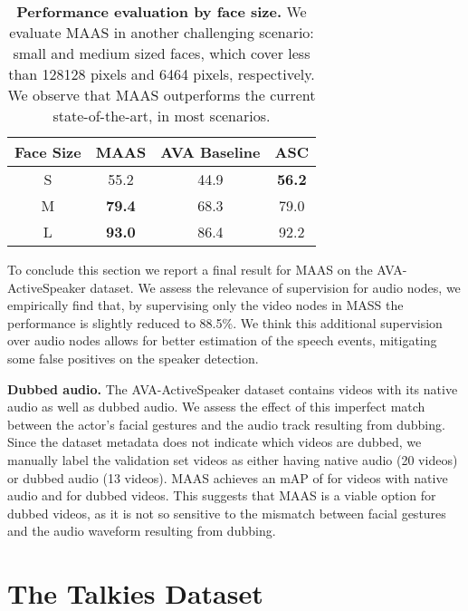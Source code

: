 \documentclass[10pt,twocolumn,letterpaper]{article}
\begin{document}
\begin{table}[h]
    \small
    \centering
    \begin{tabular}{c c c c }
        \hline
        \textbf{Face Size}  & \textbf{MAAS}  & \textbf{AVA Baseline} \cite{roth2019ava} & \textbf{ASC} \cite{alcazar2020active} \\
        \hline 
        S & 55.2 & 44.9 & \textbf{56.2} \\
        M & \textbf{79.4} & 68.3 & 79.0 \\
        L & \textbf{93.0} & 86.4 & 92.2 \\
        \hline
    \end{tabular}
    
    \caption{\textbf{Performance evaluation by face size.} 
    We evaluate MAAS in another challenging scenario: small and medium sized faces, which cover less than 128128 pixels and 6464 pixels, respectively. We observe that MAAS outperforms the current state-of-the-art, in most scenarios.
    }
    \label{tab:sizes}
\end{table} 

To conclude this section we report a final result for MAAS on the AVA-ActiveSpeaker dataset. We assess the relevance of supervision for audio nodes, we empirically find that, by supervising only the video nodes in MASS the performance is slightly reduced to 88.5\%. We think this additional supervision over audio nodes allows for better estimation of the speech events, mitigating some false positives on the speaker detection.

\noindent \textbf{Dubbed audio.} The AVA-ActiveSpeaker dataset contains videos with its native audio as well as dubbed audio. We assess the effect of this imperfect match between the actor's facial gestures and the audio track resulting from dubbing. Since the dataset metadata does not indicate which videos are dubbed, we manually label the validation set videos as either having  native audio (20 videos) or  dubbed audio (13 videos). MAAS achieves an mAP of  for videos with native audio and  for dubbed videos. This suggests that MAAS is a viable option for dubbed videos, as it is not so sensitive to the mismatch between facial gestures and the audio waveform resulting from dubbing. 






 \section{The Talkies Dataset} 
\label{sec:talkies}
\end{document}
